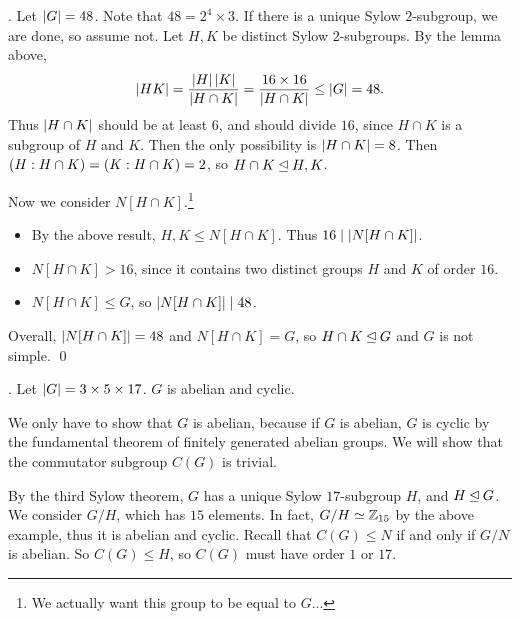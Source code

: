 \ex. Let \(\left| G \right| = 48\). Note that \(48 = 2^4 \times 3\). If there is a unique Sylow \(2\)-subgroup, we are done, so assume not. Let \(H, K\) be distinct Sylow \(2\)-subgroups. By the lemma above,
\[
    \left| HK \right| = \frac{\left| H \right| \left| K \right|}{\left| H \cap K \right|} = \frac{16 \times 16}{\left| H \cap K \right|} \leq \left| G \right| = 48.
\]
Thus \(\left| H \cap K \right|\) should be at least \(6\), and should divide \(16\), since \(H \cap K\) is a subgroup of \(H\) and \(K\). Then the only possibility is \(\left| H \cap K \right| = 8\). Then \(\left(H : H \cap K\right) = \left(K : H \cap K\right) = 2\), so \(H \cap K \unlhd H, K\).

Now we consider \(N[H \cap K]\).\footnote{We actually want this group to be equal to \(G\)...}
\begin{itemize}
    \item By the above result, \(H, K \leq N[H \cap K]\). Thus \(16 \mid \left| N[H \cap K] \right|\).
    \item \(N[H \cap K] > 16\), since it contains two distinct groups \(H\) and \(K\) of order \(16\).
    \item \(N[H \cap K] \leq G\), so \(\left| N[H\cap K] \right| \mid 48\).
\end{itemize}

Overall, \(\left| N[H\cap K] \right| = 48\) and \(N[H \cap K] = G\), so \(H \cap K \unlhd G\) and \(G\) is not simple. \qed

\ex. Let \(\left| G \right| = 3 \times 5 \times 17\). \(G\) is abelian and cyclic.

\pf We only have to show that \(G\) is abelian, because if \(G\) is abelian, \(G\) is cyclic by the fundamental theorem of finitely generated abelian groups. We will show that the commutator subgroup \(C(G)\) is trivial.

By the third Sylow theorem, \(G\) has a unique Sylow \(17\)-subgroup \(H\), and \(H \unlhd G\). We consider \(G/H\), which has \(15\) elements. In fact, \(G/H \simeq \mathbb{Z}_{15}\) by the above example, thus it is abelian and cyclic. Recall that \(C(G) \leq N\) if and only if \(G/N\) is abelian. So \(C(G) \leq H\), so \(C(G)\) must have order \(1\) or \(17\).

